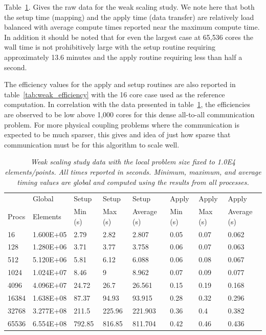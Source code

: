\documentclass{mc2013}
\begin{document}
Table~\ref{tab:weak_scaling}. Gives the raw data for the weak scaling
study. We note here that both the setup time (mapping) and the apply
time (data transfer) are relatively load balanced with average compute
times reported near the maximum compute time. In addition it should be
noted that for even the largest case at 65,536 cores the wall time is
not prohibitively large with the setup routine requiring approximately
13.6 minutes and the apply routine requiring less than half a second.

The efficiency values for the apply and setup routines are also
reported in table~\ref{tab:weak_efficiency} with the 16 core case used
as the reference computation. In correlation with the data presented
in table~\ref{tab:weak_scaling}, the efficiencies are observed to be
low above 1,000 cores for this dense all-to-all communication
problem. For more physical coupling problems where the communication
is expected to be much sparser, this gives and idea of just how sparse
that communication must be for this algorithm to scale well.

\begin{table}[htpb!]
  \begin{center}
    \begin{tabular}{llllllll}\hline\hline
      \multicolumn{1}{l}{} & 
      \multicolumn{1}{l}{Global} & 
      \multicolumn{1}{l}{Setup} & 
      \multicolumn{1}{l}{Setup} & 
      \multicolumn{1}{l}{Setup} & 
      \multicolumn{1}{l}{Apply} & 
      \multicolumn{1}{l}{Apply} & 
      \multicolumn{1}{l}{Apply}\\
      \multicolumn{1}{l}{Procs} & 
      \multicolumn{1}{l}{Elements} & 
      \multicolumn{1}{l}{Min (s)} & 
      \multicolumn{1}{l}{Max (s)} & 
      \multicolumn{1}{l}{Average (s)} & 
      \multicolumn{1}{l}{Min (s)} & 
      \multicolumn{1}{l}{Max (s)} & 
      \multicolumn{1}{l}{Average (s)}\\ \hline\hline
16 &	1.600E+05 & 2.79 &	2.82 &	  2.807 &	0.05 & 0.07 &	0.062 \\
128 &	1.280E+06 & 3.71 &	3.77 &	  3.758 &	0.06 &	0.07 &	0.063 \\
512 &	5.120E+06 & 5.81 &	6.12 &	  6.088 &	0.06 &	0.08 &	0.067 \\
1024 &	1.024E+07 & 8.46 &	9 &       8.962 &	0.07 &	0.09 &	0.077 \\
4096 &	4.096E+07 & 24.72 &	26.7 &	  26.561 &	0.15 &	0.19 &	0.168 \\
16384 &	1.638E+08 & 87.37 &	94.93 &	  93.915 &	0.28 &	0.32 &	0.296 \\
32768 &	3.277E+08 & 211.5 &	225.96 &  221.903 &	0.36 &	0.4 &	0.382 \\
65536 &	6.554E+08 & 792.85 & 816.85	& 811.704 &	0.42 &	0.46 &	0.436 \\
      \hline\hline
    \end{tabular}
  \end{center}
  \caption{\sl Weak scaling study data with the local problem size
    fixed to 1.0E4 elements/points. All times reported in
    seconds. Minimum, maximum, and average timing values are global
    and computed using the results from all processes.}
  \label{tab:weak_scaling}
\end{table}
\end{document}
